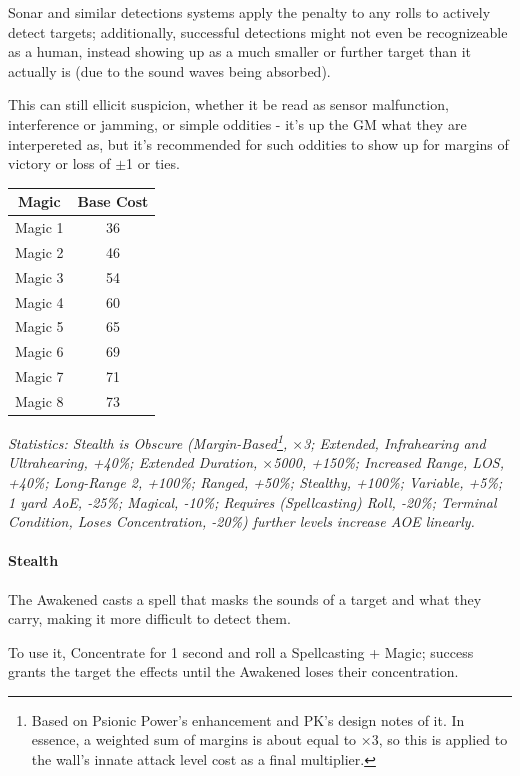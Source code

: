 \begin{multicols*}{3}
	Sonar and similar detections systems apply the penalty to any rolls to actively detect targets; additionally, successful detections might not even be recognizeable as a human, instead showing up as a much smaller or further target than it actually is (due to the sound waves being absorbed). 
	
	This can still ellicit suspicion, whether it be read as sensor malfunction, interference or jamming, or simple oddities - it's up the GM what they are interpereted as, but it's recommended for such oddities to show up for margins of victory or loss of $\pm$1 or ties.
	
	\begin{center}
		\begin{tabular}{|c|c|}
			\hline
			Magic & Base Cost \\
			\hline
			\hline
			Magic 1 & 36 \\
			Magic 2 & 46 \\
			Magic 3 & 54 \\
			Magic 4 & 60 \\
			Magic 5 & 65 \\
			Magic 6 & 69 \\
			Magic 7 & 71 \\
			Magic 8 & 73 \\
			\hline
		\end{tabular}
	\end{center}
	
	\textcolor{OliveGreen}{\textit{Statistics: Stealth is Obscure (Margin-Based\footnote{Based on Psionic Power’s enhancement and PK’s design notes of it. In essence, a weighted sum of margins is about equal to ×3, so this is applied to the wall’s innate attack level cost as a final multiplier.}, $\times$3; Extended, Infrahearing and Ultrahearing, +40\%; Extended Duration, $\times$5000, +150\%; Increased Range, LOS, +40\%; Long-Range 2, +100\%; Ranged, +50\%; Stealthy, +100\%; Variable, +5\%; 1 yard AoE, -25\%; Magical, -10\%; Requires (Spellcasting) Roll, -20\%; Terminal Condition, Loses Concentration, -20\%) further levels increase AOE linearly.}}
	
	\paragraph{Stealth}
	
	The Awakened casts a spell that masks the sounds of a target and what they carry, making it more difficult to detect them.
	
	To use it, Concentrate for 1 second and roll a Spellcasting + Magic; success grants the target the effects until the Awakened loses their concentration.
	

\end{multicols*}
